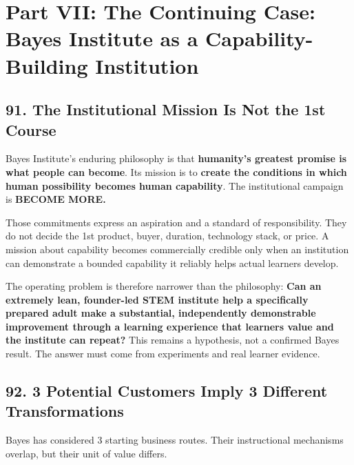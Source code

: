 \section*{Part VII: The Continuing Case: Bayes Institute as a Capability-Building Institution}

\subsection*{91. The Institutional Mission Is Not the 1st Course}

Bayes Institute's enduring philosophy is that \textbf{humanity's greatest promise is what people can become}. Its mission is to \textbf{create the conditions in which human possibility becomes human capability}. The institutional campaign is \textbf{BECOME MORE.}

Those commitments express an aspiration and a standard of responsibility. They do not decide the 1st product, buyer, duration, technology stack, or price. A mission about capability becomes commercially credible only when an institution can demonstrate a bounded capability it reliably helps actual learners develop.

The operating problem is therefore narrower than the philosophy: \textbf{Can an extremely lean, founder-led STEM institute help a specifically prepared adult make a substantial, independently demonstrable improvement through a learning experience that learners value and the institute can repeat?} This remains a hypothesis, not a confirmed Bayes result. The answer must come from experiments and real learner evidence.

\subsection*{92. 3 Potential Customers Imply 3 Different Transformations}

Bayes has considered 3 starting business routes. Their instructional mechanisms overlap, but their unit of value differs.

